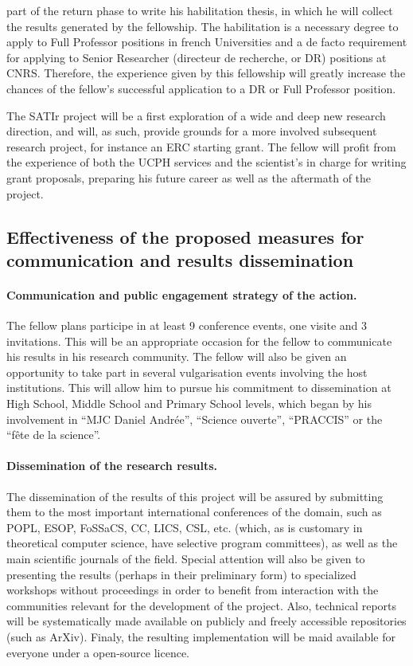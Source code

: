 \documentclass{article}[11pt]
\begin{document}
part of the return phase to write his habilitation thesis, in which he will collect the results generated by the fellowship. The habilitation is a necessary degree to apply to Full Professor positions in french Universities and a de facto requirement for applying to Senior Researcher (directeur de recherche, or DR) positions at CNRS. Therefore, the experience given by this fellowship will greatly increase the chances of the fellow’s successful application to a DR or Full Professor position.

The SATIr project will be a first exploration of a wide and deep new research direction, and will,
as such, provide grounds for a more involved subsequent research project, for instance an ERC starting
grant. The fellow will profit from the experience of both the UCPH services and the scientist’s in charge
for writing grant proposals, preparing his future career as well as the aftermath of the project.




\subsection{Effectiveness of the proposed measures for communication and results dissemination}

\paragraph{Communication and public engagement strategy of the action.} 
The fellow plans participe in at least 9 conference events, one visite and 3 invitations. This will be an appropriate occasion for the fellow to communicate his results in his research community. The fellow will also be given an opportunity to take part in several vulgarisation events involving the host institutions. This will allow him to pursue his commitment to dissemination at High School, Middle School and Primary School levels, which began by his involvement in “MJC Daniel Andrée”, ``Science ouverte'', ``PRACCIS'' or the “fête de la science”.


\paragraph{Dissemination of the research results.} 
The dissemination of the results of this project will be assured by submitting them to the most important international conferences of the domain, such as POPL, ESOP, FoSSaCS, CC, LICS, CSL, etc. (which, as is customary in theoretical computer science, have selective program committees), as well as the main scientific journals of the field. Special attention will also be given to presenting the results (perhaps in their preliminary form) to specialized workshops without proceedings in order to benefit from interaction with the communities relevant for the development of the project. Also, technical reports will be systematically made available on publicly and freely accessible repositories (such as ArXiv). Finaly, the resulting implementation will be maid available for everyone under a open-source licence.
\end{document}
